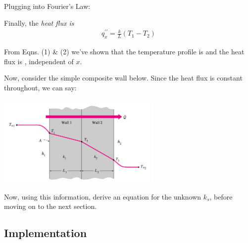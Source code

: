\documentclass[11pt, letterpaper]{article}
\begin{document}
Plugging into Fourier's Law:


Finally, the \it{heat flux} is
\begin{align}
    q_x^{\prime\prime} = \frac{k}{L} (T_1 - T_2)
\end{align}

From Eqns. (1) \& (2) we've shown that the temperature profile is  and the heat flux is , independent of $x$. 

\n
Now, consider the simple composite wall below. Since the heat flux is constant throughout, we can say:






\begin{minipage}[c]{0.50\textwidth}
{\small
\begin{center}
\begin{tcolorbox}[enhanced, width=5cm, top=-4mm, colback=red!5, colframe=black!50!white, boxrule=0.5pt, boxsep=1.5mm, bottom=1mm]
\end{tcolorbox}
\end{center}
}
\end{minipage}  \hfill
\begin{minipage}[c]{0.50\linewidth}
\hspace{-5mm}
\vspace{-2ex}
    \includegraphics[width=80mm]{gfx/fig5.png}\label{fig5}
\vspace{2pt}
\end{minipage}

Now, using this information, derive an equation for the unknown $k_s$, before moving on to the next section.

\subsection{Implementation}
\end{document}
